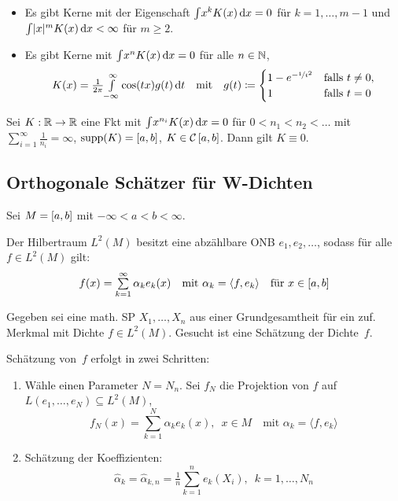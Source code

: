 \documentclass{cheat-sheet}
\newcommand{\Cont}{\mathcal{C}} %
\newcommand{\scp}[2]{\langle #1, #2 \rangle} %
\begin{document}
\begin{bemn}
  \begin{itemize}
    \item Es gibt Kerne mit der Eigenschaft ${\textstyle \int} x^k K(x) \,\mathrm{d} x = 0$ für $k = 1, \ldots, m - 1$ und ${\textstyle \int} \lvert x\rvert^m K(x) \,\mathrm{d} x < \infty$ für $m \geq 2$.
    \item Es gibt Kerne mit ${\textstyle \int} x^n K(x) \,\mathrm{d} x = 0$ für alle $n \in \mathbb{N}$, \zB{}
    \[
      K(x) = \tfrac{1}{2 \pi} {\textstyle \int\limits_{- \infty}^{\infty}} \cos(t x) g(t) \,\mathrm{d} t
      \quad \text{mit} \quad
      g(t) \coloneqq \begin{cases}
        1 - e^{- \nicefrac{1}{t^2}} & \text{falls } t \neq 0, \\
        1 & \text{falls } t = 0
      \end{cases}
    \]
  \end{itemize}
\end{bemn}

\begin{satz}[H. Müntz]
  Sei $K : \mathbb{R} \to \mathbb{R}$ eine Fkt mit ${\textstyle \int} x^{n_i} K(x) \,\mathrm{d} x = 0$ für $0 < n_1 < n_2 < \ldots$ mit ${\sum}_{i=1}^\infty \tfrac{1}{n_i} = \infty$, $\operatorname{supp}(K) = \left[ a, b \right]$, $K \in \Cont \cinterval{a}{b}$. Dann gilt $K \equiv 0$.
\end{satz}

\subsection{Orthogonale Schätzer für W-Dichten}

\begin{voraussetzung}
  Sei $M = \left[ a, b \right]$ mit $- \infty < a < b < \infty$.
\end{voraussetzung}

\begin{bem}
  Der Hilbertraum $L^2(M)$ besitzt eine abzählbare ONB $e_1, e_2, \ldots$, sodass für alle $f \in L^2(M)$ gilt:
  \[
    f(x) = \sum_{k=1}^\infty \alpha_k e_k(x)
    \quad \text{mit } \alpha_k = \scp{f}{e_k}
    \quad \text{für } x \in \cinterval{a}{b}
  \]
\end{bem}

\begin{problem}
  Gegeben sei eine math. SP $X_1, \ldots, X_n$ aus einer Grundgesamtheit für ein zuf. Merkmal mit Dichte $f \in L^2(M)$.
  Gesucht ist eine Schätzung der Dichte~$f$.
\end{problem}

\begin{verf}
  Schätzung von~$f$ erfolgt in zwei Schritten:
  \begin{enumerate}
    \item Wähle einen Parameter $N = N_n$.
    Sei $f_N$ die Projektion von $f$ auf $L(e_1, \ldots, e_N) \subseteq L^2(M)$,
    \[
      f_N(x) = \sum_{k=1}^N \alpha_k e_k(x), \enspace x \in M
      \quad \text{mit } \alpha_k = \scp{f}{e_k}
    \]
    \item Schätzung der Koeffizienten:
    \[
      \hat{\alpha}_k = \hat{\alpha}_{k,n} = \tfrac{1}{n} \sum_{k=1}^n e_k(X_i), \enspace k = 1, \ldots, N_n
    \]
  \end{enumerate}
\end{verf}
\end{document}
